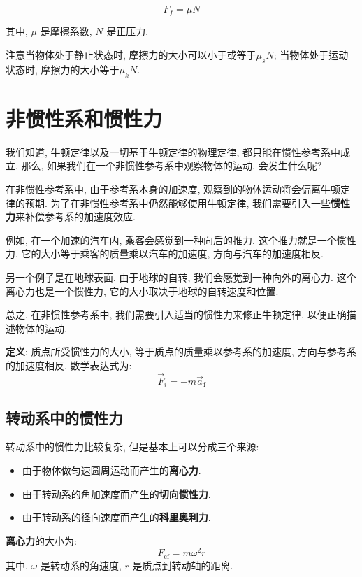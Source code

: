 \documentclass[
  a4paper,
]{ctexrep}
\providecommand{\tightlist}{%
  \setlength{\itemsep}{0pt}\setlength{\parskip}{0pt}}
\begin{document}
\[F_f = \mu N\]

其中, \(\mu\) 是摩擦系数, \(N\) 是正压力.

注意当物体处于静止状态时, 摩擦力的大小可以小于或等于\(\mu_s N\);
当物体处于运动状态时, 摩擦力的大小等于\(\mu_k N\).

\section{非惯性系和惯性力}\label{ux975eux60efux6027ux7cfbux548cux60efux6027ux529b}

我们知道, 牛顿定律以及一切基于牛顿定律的物理定律,
都只能在惯性参考系中成立. 那么,
如果我们在一个非惯性参考系中观察物体的运动, 会发生什么呢?

在非惯性参考系中, 由于参考系本身的加速度,
观察到的物体运动将会偏离牛顿定律的预期.
为了在非惯性参考系中仍然能够使用牛顿定律,
我们需要引入一些\textbf{惯性力}来补偿参考系的加速度效应.

例如, 在一个加速的汽车内, 乘客会感觉到一种向后的推力.
这个推力就是一个惯性力, 它的大小等于乘客的质量乘以汽车的加速度,
方向与汽车的加速度相反.

另一个例子是在地球表面, 由于地球的自转, 我们会感觉到一种向外的离心力.
这个离心力也是一个惯性力, 它的大小取决于地球的自转速度和位置.

总之, 在非惯性参考系中, 我们需要引入适当的惯性力来修正牛顿定律,
以便正确描述物体的运动.

\textbf{定义}: 质点所受惯性力的大小, 等于质点的质量乘以参考系的加速度,
方向与参考系的加速度相反. 数学表达式为:
\[\vec{F}_{i} = -m \vec{a}_{\text{f}}\]

\subsection{转动系中的惯性力}\label{ux8f6cux52a8ux7cfbux4e2dux7684ux60efux6027ux529b}

转动系中的惯性力比较复杂, 但是基本上可以分成三个来源:

\begin{itemize}
\tightlist
\item
  由于物体做匀速圆周运动而产生的\textbf{离心力}.
\item
  由于转动系的角加速度而产生的\textbf{切向惯性力}.
\item
  由于转动系的径向速度而产生的\textbf{科里奥利力}.
\end{itemize}

\textbf{离心力}的大小为: \[F_{\text{cf}} = m \omega^2 r\] 其中,
\(\omega\) 是转动系的角速度, \(r\) 是质点到转动轴的距离.
\end{document}

